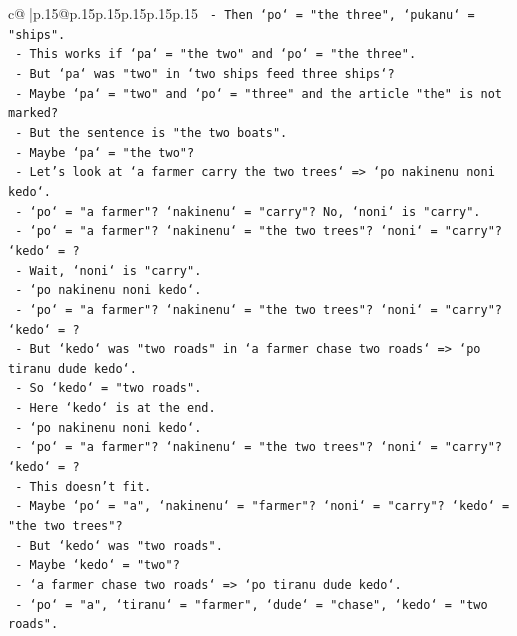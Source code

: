 \documentclass{article}
\begin{document}
{\begin{supertabular}{c@{$\;$}|p{.15\linewidth}@{}p{.15\linewidth}p{.15\linewidth}p{.15\linewidth}p{.15\linewidth}p{.15\linewidth}}
{{{\texttt{       {-} Then `po` = "the three", `pukanu` = "ships".} \\
\texttt{       {-} This works if `pa` = "the two" and `po` = "the three".} \\
\texttt{       {-} But `pa` was "two" in `two ships feed three ships`?} \\
\texttt{       {-} Maybe `pa` = "two" and `po` = "three" and the article "the" is not marked?} \\
\texttt{       {-} But the sentence is "the two boats".} \\
\texttt{       {-} Maybe `pa` = "the two"?} \\
\texttt{       {-} Let's look at `a farmer carry the two trees` => `po nakinenu noni kedo`.} \\
\texttt{         {-} `po` = "a farmer"? `nakinenu` = "carry"? No, `noni` is "carry".} \\
\texttt{         {-} `po` = "a farmer"? `nakinenu` = "the two trees"? `noni` = "carry"? `kedo` = ?} \\
\texttt{         {-} Wait, `noni` is "carry".} \\
\texttt{         {-} `po nakinenu noni kedo`.} \\
\texttt{         {-} `po` = "a farmer"? `nakinenu` = "the two trees"? `noni` = "carry"? `kedo` = ?} \\
\texttt{         {-} But `kedo` was "two roads" in `a farmer chase two roads` => `po tiranu dude kedo`.} \\
\texttt{         {-} So `kedo` = "two roads".} \\
\texttt{         {-} Here `kedo` is at the end.} \\
\texttt{         {-} `po nakinenu noni kedo`.} \\
\texttt{         {-} `po` = "a farmer"? `nakinenu` = "the two trees"? `noni` = "carry"? `kedo` = ?} \\
\texttt{         {-} This doesn't fit.} \\
\texttt{         {-} Maybe `po` = "a", `nakinenu` = "farmer"? `noni` = "carry"? `kedo` = "the two trees"?} \\
\texttt{         {-} But `kedo` was "two roads".} \\
\texttt{         {-} Maybe `kedo` = "two"?} \\
\texttt{         {-} `a farmer chase two roads` => `po tiranu dude kedo`.} \\
\texttt{           {-} `po` = "a", `tiranu` = "farmer", `dude` = "chase", `kedo` = "two roads".} \\
}}}
\end{supertabular}}
\end{document}
